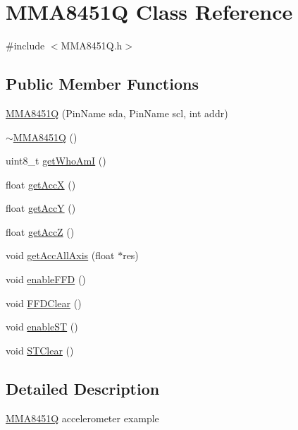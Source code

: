\hypertarget{classMMA8451Q}{}\section{M\+M\+A8451Q Class Reference}
\label{classMMA8451Q}


{\ttfamily \#include $<$M\+M\+A8451\+Q.\+h$>$}

\subsection*{Public Member Functions}
\begin{DoxyCompactItemize}
\item 
\hyperlink{classMMA8451Q_a59430cfeb113615458a2b73fdc7391e9}{M\+M\+A8451Q} (Pin\+Name sda, Pin\+Name scl, int addr)
\item 
\hyperlink{classMMA8451Q_add2fade85a24b3c6ae7cc489a04ba009}{$\sim$\+M\+M\+A8451Q} ()
\item 
uint8\+\_\+t \hyperlink{classMMA8451Q_adbf87f413cfa95e88d49990b2a4af6d4}{get\+Who\+AmI} ()
\item 
float \hyperlink{classMMA8451Q_a9226a2f00edef47be520ecca28d6a425}{get\+AccX} ()
\item 
float \hyperlink{classMMA8451Q_a365e88d07f16faa9da4183f34055b4a5}{get\+AccY} ()
\item 
float \hyperlink{classMMA8451Q_afb63783e2e4d3af92229dd0311905132}{get\+AccZ} ()
\item 
void \hyperlink{classMMA8451Q_a6d7892d095e4f697b6f50ebc3d4b4cfc}{get\+Acc\+All\+Axis} (float $\ast$res)
\item 
void \hyperlink{classMMA8451Q_ac0b192ecf6a7e799de50cb90e4f36e26}{enable\+F\+FD} ()
\item 
void \hyperlink{classMMA8451Q_a068f21143998cbe01f3e4cfb41c454d7}{F\+F\+D\+Clear} ()
\item 
void \hyperlink{classMMA8451Q_a5d140cede4acca028ae1b46e59b32454}{enable\+ST} ()
\item 
void \hyperlink{classMMA8451Q_ab64af19fd418c9439cf3c41530d63543}{S\+T\+Clear} ()
\end{DoxyCompactItemize}


\subsection{Detailed Description}
\hyperlink{classMMA8451Q}{M\+M\+A8451Q} accelerometer example


